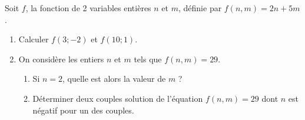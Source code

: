 
Soit $f$, la fonction de 2 variables entières $n$ et $m$, définie par $f(n,m)=2n+5m$.
\begin{enumerate}
\item Calculer $f(3;-2)$ et $f(10;1)$.
\item On considère les entiers $n$ et $m$ tels que $f(n,m)=29$. 
\begin{enumerate}
\item Si $n=2$, quelle est alors la valeur de $m$ ?
\item Déterminer deux couples solution de l'équation $f(n,m)=29$ dont $n$ est négatif pour un des couples. 
\end{enumerate}
\end{enumerate}